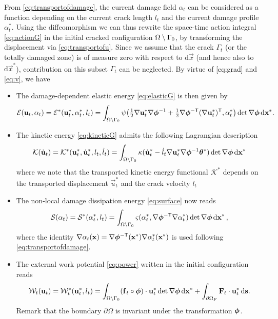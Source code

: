 From \eqref{eq:transportofdamage}, the current damage field $\alpha_t$ can be considered as a function depending on the current crack length $l_t$ and the current damage profile $\alpha_t^*$. Using the diffeomorphism we can thus rewrite the space-time action integral \eqref{eq:actionG} in the initial cracked configuration ${\Omega\setminus\Gamma_0}$, by transforming the displacement via \eqref{eq:transportofu}. Since we assume that the crack $\Gamma_t$ (or the totally damaged zone) is of measure zero with respect to $\mathrm{d}\vec{x}$ (and hence also to $\mathrm{d}\vec{x}^*$), contribution on this subset $\Gamma_t$ can be neglected. By virtue of \eqref{eq:grad} and \eqref{eq:v}, we have
\begin{itemize}
\item The damage-dependent elastic energy \eqref{eq:elasticG} is then given by
\begin{equation} \label{eq:elasticGi}
\mathcal{E}(\vec{u}_t,\alpha_t)=\mathcal{E}^*(\vec{u}_t^*,\alpha_t^*,l_t)=\int_\domaini\psi\bigl({\textstyle\frac{1}{2}}\nabla\vec{u}_t^*\nabla\philt^{-1}+{\textstyle\frac{1}{2}}\nabla\philt^{-\mathsf{T}}(\nabla\vec{u}_t^*)^\mT,\alpha_t^*\bigr)\det\nabla\philt\dxx.
\end{equation}

\item The kinetic energy \eqref{eq:kineticG} admits the following Lagrangian description
\begin{equation} \label{eq:kinetici}
\mathcal{K}(\dot{\vec{u}}_t)=\mathcal{K}^*(\vec{u}_t^*,\dot{\vec{u}}_t^*,l_t,\dot{l}_t)=\int_\domaini\kappa(\dot{\vec{u}}_t^*-\dot{l}_t\nabla\vec{u}_t^*\nabla\philt^{-1}\vtheta^*)\det\nabla\philt\dxx
\end{equation}
where we note that the transported kinetic energy functional $\mathcal{K}^*$ depends on the transported displacement $\vec{u}_t^*$ and the crack velocity $\dot{l}_t$

\item The non-local damage dissipation energy \eqref{eq:surface} now reads
\begin{equation} \label{eq:surfacei}
\mathcal{S}(\alpha_t)=\mathcal{S}^*(\alpha_t^*,l_t)=\int_\domaini\varsigma(\alpha_t^*,\nabla\philt^{-\mT}\nabla\alpha_t^*)\det\nabla\philt\dxx\,,
\end{equation}
where the identity $\nabla\alpha_t(\vec{x})=\nabla\philt^{-\mT}(\vec{x}^*)\nabla\alpha_t^*(\vec{x}^*)$ is used following \eqref{eq:transportofdamage}.

\item The external work potential \eqref{eq:power} written in the initial configuration reads
\begin{equation} \label{eq:externalworki}
\mathcal{W}_t(\vec{u}_t)=\mathcal{W}^*_t(\vec{u}_t^*,l_t)=\int_\domaini (\vec{f}_t\circ\philt)\cdot\vec{u}_t^*\det\nabla\philt\dxx+\int_{\partial\Omega_F} \vec{F}_t\cdot\vec{u}_t^*\D{\vec{s}}.
\end{equation}
Remark that the boundary $\partial\Omega$ is invariant under the transformation $\philt$.


\end{itemize}
